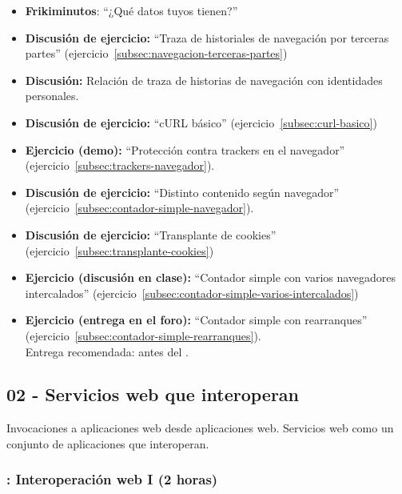 \documentclass[a4paper,12pt]{article}
\begin{document}
\begin{itemize}
\item \textbf{Frikiminutos}: ``¿Qué datos tuyos tienen?''
\item \textbf{Discusión de ejercicio:} ``Traza de historiales de navegación por terceras partes'' (ejercicio~\ref{subsec:navegacion-terceras-partes})
\item \textbf{Discusión:} Relación de traza de historias de navegación con identidades personales.
\item \textbf{Discusión de ejercicio:} ``cURL básico'' (ejercicio~\ref{subsec:curl-basico})
\item \textbf{Ejercicio (demo):} ``Protección contra trackers en el navegador'' (ejercicio~\ref{subsec:trackers-navegador}).
\item \textbf{Discusión de ejercicio:} ``Distinto contenido según navegador'' (ejercicio~\ref{subsec:contador-simple-navegador}).
\item \textbf{Discusión de ejercicio:} ``Transplante de cookies'' (ejercicio~\ref{subsec:transplante-cookies})
\item \textbf{Ejercicio (discusión en clase):} ``Contador simple con varios 
navegadores intercalados'' (ejercicio~\ref{subsec:contador-simple-varios-intercalados})
\item \textbf{Ejercicio (entrega en el foro):} ``Contador simple con rearranques'' (ejercicio~\ref{subsec:contador-simple-rearranques}).\\
  Entrega recomendada: antes del \lunesF.
\end{itemize}

\subsection{02 - Servicios web que interoperan}

Invocaciones a aplicaciones web desde aplicaciones web. Servicios web como un conjunto de aplicaciones que interoperan.

\subsubsection{\lunesF: Interoperación web I (2 horas)}
\label{cal:lunesF}
\end{document}
